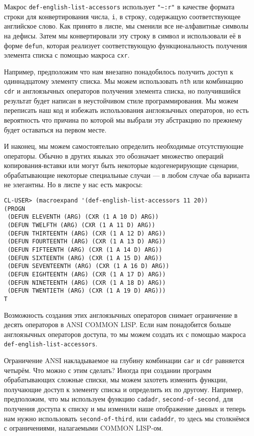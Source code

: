 Макрос \verb"def-english-list-accessors" использует \verb|"~:r"| в качестве формата строки для конвертирования числа, \verb|i|, в строку, содержащую соответствующее английское слово. Как принято в лиспе, мы сменили все не-алфавитные символы на дефисы. Затем мы конвертировали эту строку в символ и использовали её в форме \verb|defun|, которая реализует соответствующую функциональность получения элемента списка с помощью макроса \verb|cxr|.

Например, предположим что нам внезапно понадобилось получить доступ к одиннадцатому элементу списка. Мы можем использовать \verb|nth| или комбинацию \verb|cdr| и англоязычных операторов получения элемента списка, но получившийся результат будет написан в неустойчивом стиле программирования. Мы можем переписать наш код и избежать использования англоязычных операторов, но есть вероятность что причина по которой мы выбрали эту абстракцию по прежнему будет оставаться на первом месте.

И наконец, мы можем самостоятельно определить необходимые отсутствующие операторы. Обычно в других языках это обозначает множество операций копирования-вставки или могут быть некоторые кодогенерирующие сценарии, обрабатывающие некоторые специальные случаи --- в любом случае оба варианта не элегантны. Но в лиспе у нас есть макросы:

\begin{verbatim}
CL-USER> (macroexpand '(def-english-list-accessors 11 20))
(PROGN
 (DEFUN ELEVENTH (ARG) (CXR (1 A 10 D) ARG))
 (DEFUN TWELFTH (ARG) (CXR (1 A 11 D) ARG))
 (DEFUN THIRTEENTH (ARG) (CXR (1 A 12 D) ARG))
 (DEFUN FOURTEENTH (ARG) (CXR (1 A 13 D) ARG))
 (DEFUN FIFTEENTH (ARG) (CXR (1 A 14 D) ARG))
 (DEFUN SIXTEENTH (ARG) (CXR (1 A 15 D) ARG))
 (DEFUN SEVENTEENTH (ARG) (CXR (1 A 16 D) ARG))
 (DEFUN EIGHTEENTH (ARG) (CXR (1 A 17 D) ARG))
 (DEFUN NINETEENTH (ARG) (CXR (1 A 18 D) ARG))
 (DEFUN TWENTIETH (ARG) (CXR (1 A 19 D) ARG)))
T
\end{verbatim}

Возможность создания этих англоязычных операторов снимает ограничение в десять операторов в ANSI COMMON LISP. Если нам понадобится больше англоязычных операторов доступа, то мы можем создать их с помощью макроса \verb|def-english-list-accessors|.

Ограничение ANSI накладываемое на глубину комбинации \verb|car| и \verb|cdr| равняется четырём. Что можно с этим сделать? Иногда при создании программ обрабатывающих сложные списки, мы можем захотеть изменить функции, получающие доступ к элементу списка и определить их по другому. Например, предположим, что мы используем функцию \verb|cadadr|, \verb|second-of-second|, для получения доступа к списку и мы изменили наше отображение данных и теперь нам нужно использовать \verb|second-of-third|, или \verb|cadaddr|, то здесь мы столкнёмся с ограничениями, налагаемыми COMMON LISP-ом.


